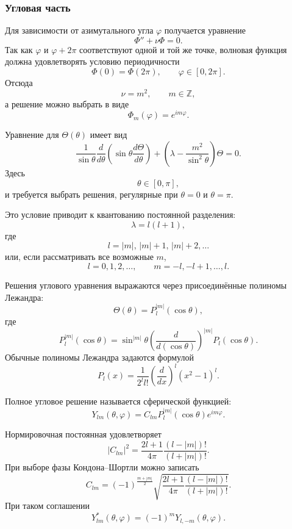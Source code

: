 \documentclass[12pt,a4paper]{article}
\begin{document}
\subsubsection{Угловая часть}

Для зависимости от азимутального угла $\varphi$ получается уравнение
\[
    \Phi''+\nu\Phi=0.
\]
Так как $\varphi$ и $\varphi+2\pi$ соответствуют одной и той же точке,
волновая функция должна удовлетворять условию периодичности
\[
    \Phi(0)=\Phi(2\pi),
    \qquad
    \varphi\in[0,2\pi].
\]
Отсюда
\[
    \nu=m^2,
    \qquad
    m\in\mathbb Z,
\]
а решение можно выбрать в виде
\[
    \boxed{
        \Phi_m(\varphi)=e^{im\varphi}
    }.
\]

Уравнение для $\Theta(\theta)$ имеет вид
\[
    \boxed{
    \frac{1}{\sin\theta}
    \frac{d}{d\theta}
    \left(
        \sin\theta\frac{d\Theta}{d\theta}
    \right)
    +
    \left(
        \lambda-\frac{m^2}{\sin^2\theta}
    \right)\Theta
    =
    0
    }.
\]
Здесь
\[
    \theta\in[0,\pi],
\]
и требуется выбрать решения, регулярные при $\theta=0$ и $\theta=\pi$.

Это условие приводит к квантованию постоянной разделения:
\[
    \boxed{
        \lambda=l(l+1)
    },
\]
где
\[
    l=|m|,\,|m|+1,\,|m|+2,\ldots
\]
или, если рассматривать все возможные $m$,
\[
    l=0,1,2,\ldots,
    \qquad
    m=-l,-l+1,\ldots,l.
\]

Решения углового уравнения выражаются через присоединённые полиномы
Лежандра:
\[
    \Theta(\theta)
    =
    P_l^{|m|}(\cos\theta),
\]
где
\[
    P_l^{|m|}(\cos\theta)
    =
    \sin^{|m|}\theta
    \left(
        \frac{d}{d(\cos\theta)}
    \right)^{|m|}
    P_l(\cos\theta).
\]
Обычные полиномы Лежандра задаются формулой
\[
    \boxed{
    P_l(x)
    =
    \frac{1}{2^l l!}
    \left(
        \frac{d}{dx}
    \right)^l
    (x^2-1)^l
    }.
\]

Полное угловое решение называется сферической функцией:
\[
    \boxed{
        Y_{lm}(\theta,\varphi)
        =
        C_{lm}
        P_l^{|m|}(\cos\theta)e^{im\varphi}
    }.
\]

Нормировочная постоянная удовлетворяет
\[
    \boxed{
    |C_{lm}|^2
    =
    \frac{2l+1}{4\pi}
    \frac{(l-|m|)!}{(l+|m|)!}
    }.
\]
При выборе фазы Кондона--Шортли можно записать
\[
    C_{lm}
    =
    (-1)^{\frac{m+|m|}{2}}
    \sqrt{
        \frac{2l+1}{4\pi}
        \frac{(l-|m|)!}{(l+|m|)!}
    }.
\]
При таком соглашении
\[
    \boxed{
        Y_{lm}^*(\theta,\varphi)
        =
        (-1)^mY_{l,-m}(\theta,\varphi)
    }.
\]
\end{document}
